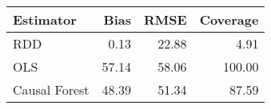 \begin{table}[ht]
\centering
\begin{tabular}{lrrr}
  \hline
Estimator & Bias & RMSE & Coverage \\ 
  \hline
RDD & 0.13 & 22.88 & 4.91 \\ 
  OLS & 57.14 & 58.06 & 100.00 \\ 
  Causal Forest & 48.39 & 51.34 & 87.59 \\ 
   \hline
\end{tabular}
\end{table}
